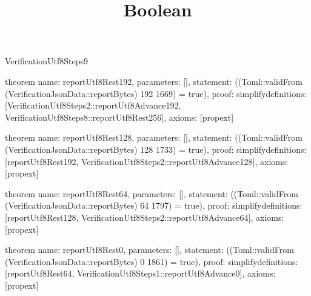\begin{lexlean}{VerificationUtf8Steps9}
\title{Boolean}
\begin{semanticmodule}

theorem{
  name: reportUtf8Rest192,
  parameters: [],
  statement: ((Toml::validFrom (VerificationJsonData::reportBytes) 192 1669) = true),
  proof: simplify{definitions: [VerificationUtf8Steps2::reportUtf8Advance192, VerificationUtf8Steps8::reportUtf8Rest256]},
  axioms: [propext]
}

theorem{
  name: reportUtf8Rest128,
  parameters: [],
  statement: ((Toml::validFrom (VerificationJsonData::reportBytes) 128 1733) = true),
  proof: simplify{definitions: [reportUtf8Rest192, VerificationUtf8Steps2::reportUtf8Advance128]},
  axioms: [propext]
}

theorem{
  name: reportUtf8Rest64,
  parameters: [],
  statement: ((Toml::validFrom (VerificationJsonData::reportBytes) 64 1797) = true),
  proof: simplify{definitions: [reportUtf8Rest128, VerificationUtf8Steps2::reportUtf8Advance64]},
  axioms: [propext]
}

theorem{
  name: reportUtf8Rest0,
  parameters: [],
  statement: ((Toml::validFrom (VerificationJsonData::reportBytes) 0 1861) = true),
  proof: simplify{definitions: [reportUtf8Rest64, VerificationUtf8Steps1::reportUtf8Advance0]},
  axioms: [propext]
}

\end{semanticmodule}
\end{lexlean}
